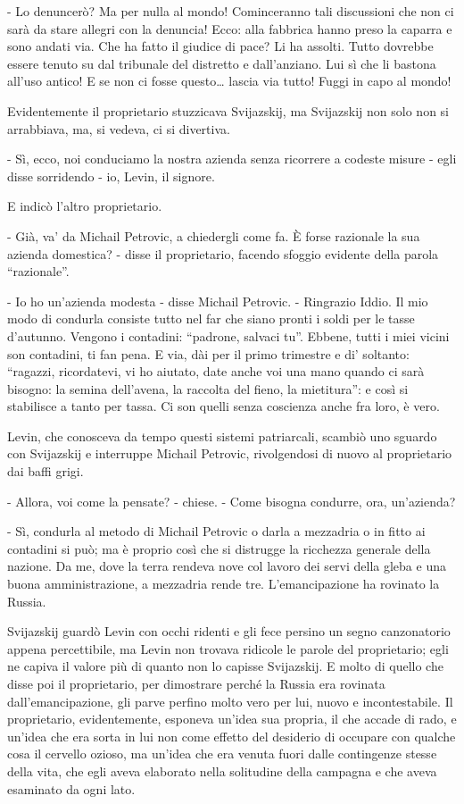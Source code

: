 - Lo denuncerò? Ma per nulla al mondo! Cominceranno tali discussioni che non ci sarà da stare allegri con la denuncia! Ecco: alla fabbrica hanno preso la caparra e sono andati via. Che ha fatto il giudice di pace? Li ha assolti. Tutto dovrebbe essere tenuto su dal tribunale del distretto e dall'anziano. Lui sì che li bastona all'uso antico! E se non ci fosse questo\ldots{} lascia via tutto! Fuggi in capo al mondo! 

Evidentemente il proprietario stuzzicava Svijazskij, ma Svijazskij non solo non si arrabbiava, ma, si vedeva, ci si divertiva. 

- Sì, ecco, noi conduciamo la nostra azienda senza ricorrere a codeste misure - egli disse sorridendo - io, Levin, il signore. 

E indicò l'altro proprietario. 

- Già, va' da Michail Petrovic, a chiedergli come fa. È forse razionale la sua azienda domestica? - disse il proprietario, facendo sfoggio evidente della parola ``razionale''. 

- Io ho un'azienda modesta - disse Michail Petrovic. - Ringrazio Iddio. Il mio modo di condurla consiste tutto nel far che siano pronti i soldi per le tasse d'autunno. Vengono i contadini: ``padrone, salvaci tu''. Ebbene, tutti i miei vicini son contadini, ti fan pena. E via, dài per il primo trimestre e di' soltanto: ``ragazzi, ricordatevi, vi ho aiutato, date anche voi una mano quando ci sarà bisogno: la semina dell'avena, la raccolta del fieno, la mietitura'': e così si stabilisce a tanto per tassa. Ci son quelli senza coscienza anche fra loro, è vero. 

Levin, che conosceva da tempo questi sistemi patriarcali, scambiò uno sguardo con Svijazskij e interruppe Michail Petrovic, rivolgendosi di nuovo al proprietario dai baffi grigi. 
\enlargethispage*{1\baselineskip}

- Allora, voi come la pensate? - chiese. - Come bisogna condurre, ora, un'azienda? 

- Sì, condurla al metodo di Michail Petrovic o darla a mezzadria o in fitto ai contadini si può; ma è proprio così che si distrugge la ricchezza generale della nazione. Da me, dove la terra rendeva nove col lavoro dei servi della gleba e una buona amministrazione, a mezzadria rende tre. L'emancipazione ha rovinato la Russia. 

Svijazskij guardò Levin con occhi ridenti e gli fece persino un segno canzonatorio appena percettibile, ma Levin non trovava ridicole le parole del proprietario; egli ne capiva il valore più di quanto non lo capisse Svijazskij. E molto di quello che disse poi il proprietario, per dimostrare perché la Russia era rovinata dall'emancipazione, gli parve perfino molto vero per lui, nuovo e incontestabile. Il proprietario, evidentemente, esponeva un'idea sua propria, il che accade di rado, e un'idea che era sorta in lui non come effetto del desiderio di occupare con qualche cosa il cervello ozioso, ma un'idea che era venuta fuori dalle contingenze stesse della vita, che egli aveva elaborato nella solitudine della campagna e che aveva esaminato da ogni lato. 

